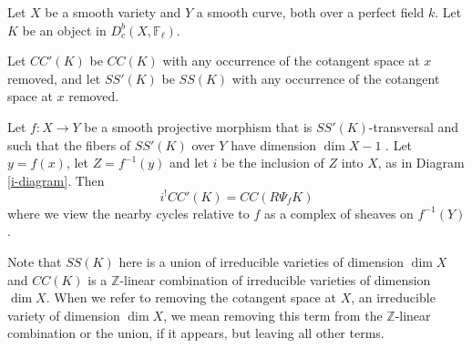 \begin{lemma}
\notready\label{nearby-formula} Let $X$ be a smooth variety and $Y$ a smooth curve, both over a perfect field $k$. Let $K$ be an object in $D^b_c(X,\mathbb F_\ell)$.

Let $CC'(K)$ be $CC(K)$ with any occurrence of the cotangent space at $x$ removed, and let $SS'(K)$ be $SS(K)$ with any occurrence of the cotangent space at $x$ removed.

Let  $f: X \to Y$ be a smooth projective morphism that is $SS'(K)$-transversal and such that the fibers of $SS'(K)$ over $Y$ have dimension $\dim X-1$ . Let $y=f(x)$, let $Z =f^{-1}(y)$ and let $i$ be the inclusion of $Z$ into $X$, as in Diagram \ref{i-diagram}.  Then
\[i^! CC'(K) = CC ( R \Psi_{f} K) \]
where we view the nearby cycles relative to $f$ as a complex of sheaves on $f^{-1}(Y)$. \end{lemma}

Note that $SS(K)$ here is a union of irreducible varieties of dimension $\dim X$ and $CC(K)$ is a $\mathbb Z$-linear combination of irreducible varieties of dimension $\dim X$. When we refer to removing the cotangent space at $X$, an irreducible variety of dimension $\dim X$, we mean removing this term from the $\mathbb Z$-linear combination or the union, if it appears, but leaving all other terms.


